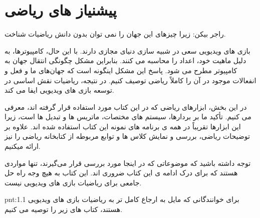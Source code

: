 \newpage

\part{پیشنیاز های ریاضی}
{
    \Large
    \begin{spacing}{1.4}
        \textbf{\vspace{3pt}}
        \begin{displayquote}
            راجر بیکن: زیرا چیزهای این جهان را نمی توان بدون دانش ریاضیات شناخت.
            \begin{flushleft}
            \end{flushleft}
        \end{displayquote}
        \textbf{\vspace{3pt}}

        بازی های ویدیویی سعی در شبیه سازی دنیای مجازی دارند.
        با این حال، کامپیوترها، به دلیل ماهیت خود، اعداد را محاسبه می کنند. بنابراین مشکل چگونگی انتقال جهان به کامپیوتر مطرح می شود.
        پاسخ این مشکل اینگونه است که جهان‌های ما و فعل و انفعالات موجود در آن را کاملاً ریاضی توصیف کنیم.
        در نتیجه، ریاضیات نقش اساسی در توسعه بازی های ویدیویی ایفا می کند.

        در این بخش، ابزارهای ریاضی که در این کتاب مورد استفاده قرار گرفته اند، معرفی می کنیم. تأکید ما بر بردارها، سیستم های مختصات، ماتریس ها و تبدیل ها است، زیرا این ابزارها تقریباً در همه ی برنامه های نمونه این کتاب استفاده شده اند.
        علاوه بر توضیحات ریاضی، بررسی و نمایش کلاس ها و توابع مربوطه از کتابخانه ریاضی  را نیز ارائه میکنیم.

        توجه داشته باشید که موضوعاتی که در اینجا مورد بررسی قرار می‌گیرند، تنها مواردی هستند که برای درک ادامه ی این کتاب ضروری اند.
        این کتاب به هیچ وجه راه حل جامعی برای ریاضیات بازی های ویدیویی نیست.

        \begin{point}{pnt:1.1}
            \Large
            برای خوانندگانی که مایل به ارجاع کامل تر به ریاضیات بازی های ویدیویی هستند، کتاب های زیر را توصیه می کنیم.
            \textbf{\vspace{-20pt}}
        \end{point}


\end{spacing}}

